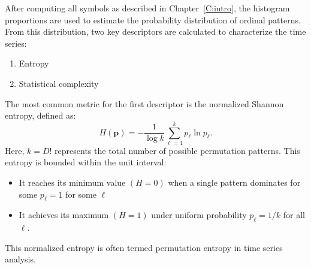 
After computing all symbols as described in Chapter~\ref{C:intro}, the histogram proportions are used to estimate the probability distribution of ordinal patterns. 
From this distribution, two key descriptors are calculated to characterize the time series:
\begin{enumerate}
	\item Entropy 
	
	\item Statistical complexity
\end{enumerate}
The most common metric for the first descriptor is the normalized Shannon entropy, defined as:
\begin{equation}
	H(\mathbf{p})=-\dfrac{1}{\log k}\sum^{k}_{\ell=1}p_{\ell} \ln{p_{\ell}}.
\end{equation}
Here, $k=D!$ represents the total number of possible permutation patterns.
This entropy is bounded within the unit interval:
\begin{itemize}
	\item It reaches its minimum value $(H=0)$ when a single pattern dominates  for some $p_{\ell}=1$ for some $\ell$ 
	\item It achieves its maximum $(H=1)$ under uniform probability $p_{\ell}=1/k$ for all $\ell$. 
\end{itemize}
This normalized entropy is often termed permutation entropy in time series analysis. 

